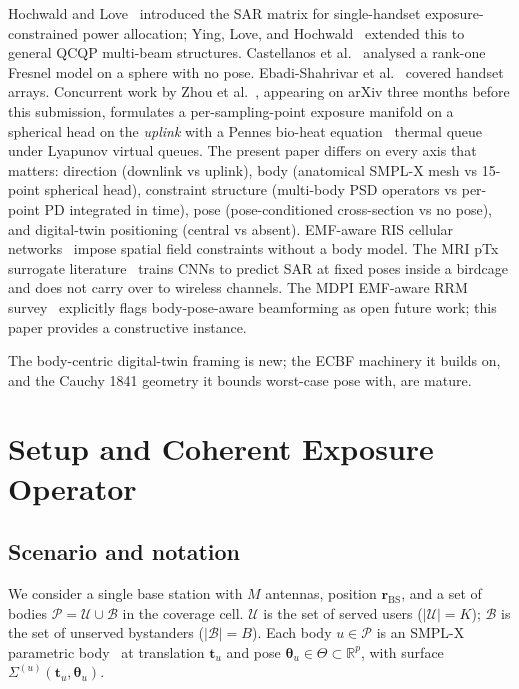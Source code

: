 \documentclass[journal,twoside,onecolumn]{IEEEtran}
\theoremstyle{definition}
\newcommand{\Reals}{\mathbb{R}}
\newcommand{\Users}{\mathcal{U}}
\newcommand{\Bodies}{\mathcal{B}}
\newcommand{\AllBodies}{\mathcal{P}}
\begin{document}
Hochwald and Love~\cite{Hochwald2014,Hochwald2019} introduced the
SAR matrix for single-handset exposure-constrained power
allocation; Ying, Love, and
Hochwald~\cite{Ying2015,Ying2017} extended this to general QCQP
multi-beam structures. Castellanos
et al.~\cite{Castellanos2020} analysed a rank-one Fresnel model
on a sphere with no pose.
Ebadi-Shahrivar et al.~\cite{EbadiShahrivar2019} covered handset
arrays. Concurrent work by
Zhou et al.~\cite{Zhou2026}, appearing on arXiv three months
before this submission, formulates a per-sampling-point exposure
manifold on a spherical head on the \emph{uplink} with
a Pennes bio-heat
equation~\cite{Pennes1948} thermal queue under Lyapunov virtual
queues. The present paper differs on every axis that matters:
direction (downlink vs uplink), body (anatomical SMPL-X mesh vs
15-point spherical head), constraint structure (multi-body PSD
operators vs per-point PD integrated in time), pose (pose-conditioned
cross-section vs no pose), and digital-twin positioning (central
vs absent). EMF-aware RIS cellular
networks~\cite{RIS-EMF2022} impose spatial field constraints
without a body model. The MRI pTx surrogate
literature~\cite{Meliado2020,Gokyar2023} trains CNNs to predict
SAR at fixed poses inside a birdcage and does not carry over to
wireless channels. The MDPI EMF-aware RRM
survey~\cite{Survey2025} explicitly flags body-pose-aware
beamforming as open future work; this paper provides a constructive
instance.

The body-centric digital-twin framing is new; the ECBF machinery
it builds on, and the Cauchy 1841 geometry it bounds worst-case
pose with, are mature.

\section{Setup and Coherent Exposure Operator}\label{sec:setup}

\subsection{Scenario and notation}

We consider a single base station with $M$ antennas, position
$\mathbf{r}_{\mathrm{BS}}$, and a set of bodies
$\AllBodies=\Users\cup\Bodies$ in the coverage cell. $\Users$ is
the set of served users ($|\Users|=K$); $\Bodies$ is the set of
unserved bystanders ($|\Bodies|=B$). Each body $u\in\AllBodies$ is
an SMPL-X parametric body~\cite{SMPL-X} at translation
$\mathbf{t}_u$ and pose $\bm\theta_u\in\Theta\subset\Reals^{p}$,
with surface $\Sigma^{(u)}(\mathbf{t}_u,\bm\theta_u)$.
\end{document}
